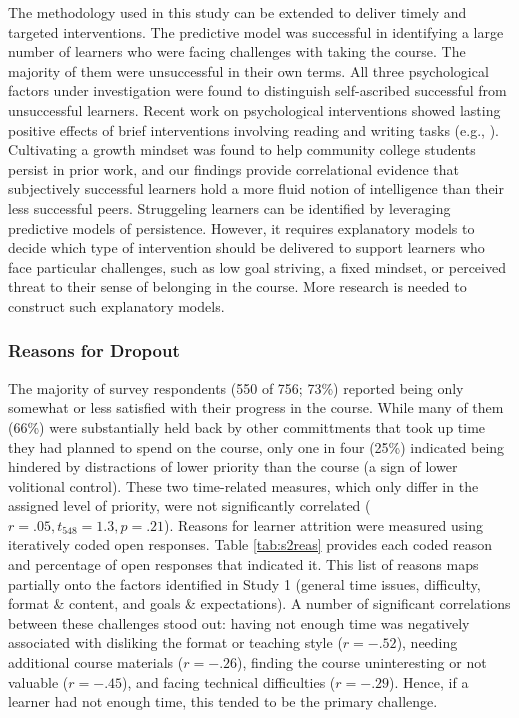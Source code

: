 \documentclass{sigchi}\usepackage[]{graphicx}\usepackage[]{color}
\begin{document}
The methodology used in this study can be extended to deliver timely and targeted interventions. The predictive model was successful in identifying a large number of learners who were facing challenges with taking the course. The majority of them were unsuccessful in their own terms. All three psychological factors under investigation were found to distinguish self-ascribed successful from unsuccessful learners. Recent work on psychological interventions showed lasting positive effects of brief interventions involving reading and writing tasks (e.g., \cite{walton2007question}). Cultivating a growth mindset was found to help community college students persist in prior work, and our findings provide correlational evidence that subjectively successful learners hold a more fluid notion of intelligence than their less successful peers. Struggeling learners can be identified by leveraging predictive models of persistence. However, it requires explanatory models to decide which type of intervention should be delivered to support learners who face particular challenges, such as low goal striving, a fixed mindset, or perceived threat to their sense of belonging in the course. More research is needed to construct such explanatory models.

\subsubsection{Reasons for Dropout}

The majority of survey respondents (550 of 756; 73\%) reported being only somewhat or less satisfied with their progress in the course. While many of them (66\%) were substantially held back by other committments that took up time they had planned to spend on the course, only one in four (25\%) indicated being hindered by distractions of lower priority than the course (a sign of lower volitional control). These two time-related measures, which only differ in the assigned level of priority, were not significantly correlated ($r=.05, t_{548}=1.3, p=.21$). Reasons for learner attrition were measured using iteratively coded open responses. Table \ref{tab:s2reas} provides each coded reason and percentage of open responses that indicated it. This list of reasons maps partially onto the factors identified in Study 1 (general time issues, difficulty, format \& content, and goals \& expectations). A number of significant correlations between these challenges stood out: having not enough time was negatively associated with disliking the format or teaching style ($r=-.52$), needing additional course materials ($r=-.26$), finding the course uninteresting or not valuable ($r=-.45$), and facing technical difficulties ($r=-.29$). Hence, if a learner had not enough time, this tended to be the primary challenge.
\end{document}
